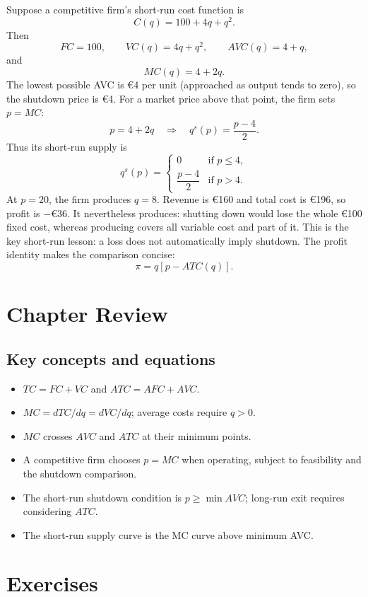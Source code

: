 Suppose a competitive firm's short-run cost function is
\[
C(q)=100+4q+q^2.
\]
Then
\[
FC=100,\qquad VC(q)=4q+q^2,\qquad AVC(q)=4+q,
\]
and
\[
MC(q)=4+2q.
\]
The lowest possible AVC is \euro4 per unit (approached as output tends to
zero), so the shutdown price is \euro4. For a market price above that point,
the firm sets $p=MC$:
\[
p=4+2q
\quad\Longrightarrow\quad
q^s(p)=\frac{p-4}{2}.
\]
Thus its short-run supply is
\[
q^s(p)=
\begin{cases}
0 & \text{if } p\leq4,\\[2pt]
\dfrac{p-4}{2} & \text{if } p>4.
\end{cases}
\]
At $p=20$, the firm produces $q=8$. Revenue is \euro160 and total cost is
\euro196, so profit is $-\euro36$. It nevertheless produces: shutting down
would lose the whole \euro100 fixed cost, whereas producing covers all
variable cost and part of it. This is the key short-run lesson: a loss does
not automatically imply shutdown. The profit identity makes the comparison concise:
\[
\pi=q[p-ATC(q)].
\]

\section*{Chapter Review}

\subsection*{Key concepts and equations}
\begin{itemize}
  \item $TC=FC+VC$ and $ATC=AFC+AVC$.
  \item $MC=dTC/dq=dVC/dq$; average costs require $q>0$.
  \item $MC$ crosses $AVC$ and $ATC$ at their minimum points.
  \item A competitive firm chooses $p=MC$ when operating, subject to
  feasibility and the shutdown comparison.
  \item The short-run shutdown condition is $p\geq\min AVC$; long-run exit
  requires considering $ATC$.
  \item The short-run supply curve is the MC curve above minimum AVC.
\end{itemize}

\section*{Exercises}

